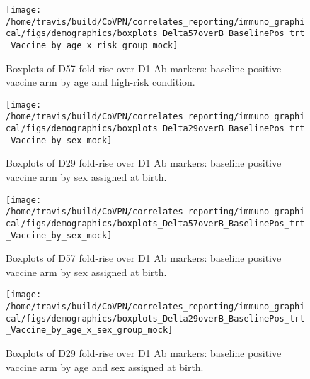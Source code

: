 \documentclass[]{book}
\theoremstyle{definition}
\theoremstyle{definition}
\theoremstyle{definition}
\newcommand{\1}{\mathbbm{1}}
\begin{document}
\clearpage
\begin{figure}[H]

{\centering \texttt{[image: /home/travis/build/CoVPN/correlates\_reporting/immuno\_graphical/figs/demographics/boxplots\_Delta57overB\_BaselinePos\_trt\_Vaccine\_by\_age\_x\_risk\_group\_mock]} 

}

\caption{Boxplots of D57 fold-rise over D1 Ab markers: baseline positive vaccine arm by age and high-risk condition.}\label{fig:unnamed-chunk-175}
\end{figure}

\clearpage

\clearpage

\clearpage
\begin{figure}[H]

{\centering \texttt{[image: /home/travis/build/CoVPN/correlates\_reporting/immuno\_graphical/figs/demographics/boxplots\_Delta29overB\_BaselinePos\_trt\_Vaccine\_by\_sex\_mock]} 

}

\caption{Boxplots of D29 fold-rise over D1 Ab markers: baseline positive vaccine arm by sex assigned at birth.}\label{fig:unnamed-chunk-178}
\end{figure}

\clearpage
\begin{figure}[H]

{\centering \texttt{[image: /home/travis/build/CoVPN/correlates\_reporting/immuno\_graphical/figs/demographics/boxplots\_Delta57overB\_BaselinePos\_trt\_Vaccine\_by\_sex\_mock]} 

}

\caption{Boxplots of D57 fold-rise over D1 Ab markers: baseline positive vaccine arm by sex assigned at birth.}\label{fig:unnamed-chunk-179}
\end{figure}

\clearpage

\clearpage

\clearpage
\begin{figure}[H]

{\centering \texttt{[image: /home/travis/build/CoVPN/correlates\_reporting/immuno\_graphical/figs/demographics/boxplots\_Delta29overB\_BaselinePos\_trt\_Vaccine\_by\_age\_x\_sex\_group\_mock]} 

}

\caption{Boxplots of D29 fold-rise over D1 Ab markers: baseline positive vaccine arm by age and sex assigned at birth.}\label{fig:unnamed-chunk-182}
\end{figure}
\end{document}
